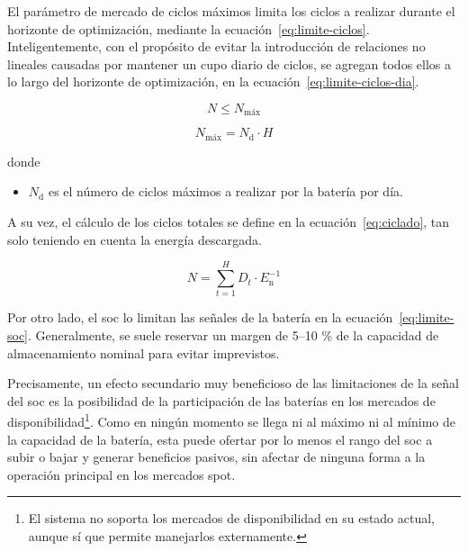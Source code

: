 El parámetro de mercado de ciclos máximos limita los ciclos a realizar durante el horizonte de optimización, mediante la ecuación~\ref{eq:limite-ciclos}. Inteligentemente, con el propósito de evitar la introducción de relaciones no lineales causadas por mantener un cupo diario de ciclos, se agregan todos ellos a lo largo del horizonte de optimización, en la ecuación~\ref{eq:limite-ciclos-dia}.

\begin{equation}%
  \label{eq:limite-ciclos}
  N \le N_{\text{máx}}
\end{equation}

\begin{samepage}

  \begin{equation}%
    \label{eq:limite-ciclos-dia}
    N_{\text{máx}} = N_{\mathrm{d}} \cdot H
  \end{equation}

  donde

  \begin{itemize}

    \item \( N_{\mathrm{d}} \) es el número de ciclos máximos a realizar por la batería por día.

  \end{itemize}

\end{samepage}

A su vez, el cálculo de los ciclos totales se define en la ecuación~\ref{eq:ciclado}, tan solo teniendo en cuenta la energía descargada.

\begin{equation}%
  \label{eq:ciclado}
  N = \sum_{t = 1}^{H} D_{t} \cdot E_{\mathrm{n}}^{-1}
\end{equation}

Por otro lado, el \gls{soc} lo limitan las señales de la batería en la ecuación~\ref{eq:limite-soc}. Generalmente, se suele reservar un margen de 5--10 \% de la capacidad de almacenamiento nominal para evitar imprevistos.

Precisamente, un efecto secundario muy beneficioso de las limitaciones de la señal del \gls{soc} es la posibilidad de la participación de las baterías en los mercados de disponibilidad\footnote{El sistema no soporta los mercados de disponibilidad en su estado actual, aunque sí que permite manejarlos externamente.}. Como en ningún momento se llega ni al máximo ni al mínimo de la capacidad de la batería, esta puede ofertar por lo menos el rango del \gls{soc} a subir o bajar y generar beneficios pasivos, sin afectar de ninguna forma a la operación principal en los mercados spot.

